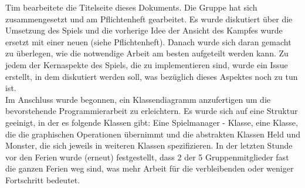 
Tim bearbeitete die Titelseite dieses Dokuments. Die Gruppe hat sich zusammengesetzt und am Pflichtenheft gearbeitet. Es wurde diskutiert über die Umsetzung des Spiels und die vorherige Idee der Ansicht des Kampfes wurde ersetzt mit einer neuen (siehe Pflichtenheft). Danach wurde sich daran gemacht zu überlegen, wie die notwendige Arbeit am besten aufgeteilt werden kann. Zu jedem der Kernaspekte des Spiels, die zu implementieren sind, wurde ein \glqq{}Issue\grqq{} erstellt, in dem diskutiert werden soll, was bezüglich dieses Aspektes noch zu tun ist.\\
Im Anschluss wurde begonnen, ein Klassendiagramm anzufertigen um die bevorstehende Programmierarbeit zu erleichtern. Es wurde sich auf eine Struktur geeinigt, in der es folgende Klassen gibt: Eine \glqq{}Spielmanager\grqq{} - Klasse, eine Klasse, die die graphischen Operationen übernimmt und die abstrakten Klassen Held und Monster, die sich jeweils in weiteren Klassen spezifizieren. In der letzten Stunde vor den Ferien wurde (erneut) festgestellt, dass 2 der 5 Gruppenmitglieder fast die ganzen Ferien weg sind, was mehr Arbeit für die verbleibenden oder weniger Fortschritt bedeutet. \\


